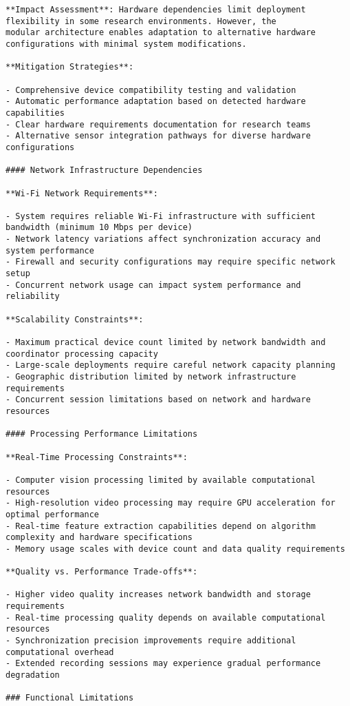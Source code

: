 \documentclass[11pt,a4paper]{report}
\begin{document}
\begin{verbatim}
**Impact Assessment**: Hardware dependencies limit deployment flexibility in some research environments. However, the
modular architecture enables adaptation to alternative hardware configurations with minimal system modifications.

**Mitigation Strategies**:

- Comprehensive device compatibility testing and validation
- Automatic performance adaptation based on detected hardware capabilities
- Clear hardware requirements documentation for research teams
- Alternative sensor integration pathways for diverse hardware configurations

#### Network Infrastructure Dependencies

**Wi-Fi Network Requirements**:

- System requires reliable Wi-Fi infrastructure with sufficient bandwidth (minimum 10 Mbps per device)
- Network latency variations affect synchronization accuracy and system performance
- Firewall and security configurations may require specific network setup
- Concurrent network usage can impact system performance and reliability

**Scalability Constraints**:

- Maximum practical device count limited by network bandwidth and coordinator processing capacity
- Large-scale deployments require careful network capacity planning
- Geographic distribution limited by network infrastructure requirements
- Concurrent session limitations based on network and hardware resources

#### Processing Performance Limitations

**Real-Time Processing Constraints**:

- Computer vision processing limited by available computational resources
- High-resolution video processing may require GPU acceleration for optimal performance
- Real-time feature extraction capabilities depend on algorithm complexity and hardware specifications
- Memory usage scales with device count and data quality requirements

**Quality vs. Performance Trade-offs**:

- Higher video quality increases network bandwidth and storage requirements
- Real-time processing quality depends on available computational resources
- Synchronization precision improvements require additional computational overhead
- Extended recording sessions may experience gradual performance degradation

### Functional Limitations


\end{verbatim}
\end{document}

